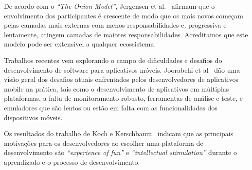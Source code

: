 \documentclass[conference]{IEEEtran}
\begin{document}
De acordo com o \emph{“The Onion Model”}, Jergensen et al.~\cite{Jergensen2011} afirmam que o envolvimento dos participantes é crescente de modo que os mais novos começam pelas camadas mais externas com menos responsabilidades e, progressiva e lentamente, atingem camadas de maiores responsabilidades. Acreditamos que este modelo pode ser extensível a qualquer ecossistema.

Trabalhos recentes vem explorando o campo de dificuldades e desafios do desenvolvimento de software para aplicativos móveis. Joorabchi et al~\cite{Joorabchi2013} dão uma visão geral dos desafios atuais enfrentados pelos desenvolvedores de aplicativos mobile na prática, tais como o desenvolvimento de aplicativos em múltiplas plataformas, a falta de monitoramento robusto, ferramentas de análise e teste, e emuladores que são lentos ou estão em falta com as funcionalidades dos dispositivos móveis.

Os resultados do trabalho de Koch e Kerschbaum~\cite{Koch2014} indicam que as principais motivações para os desenvolvedores ao escolher uma plataforma de desenvolvimento são \emph{“experience of fun”} e \emph{“intellectual stimulation”} durante o aprendizado e o processo de desenvolvimento. 



%
%
%



\end{document}
